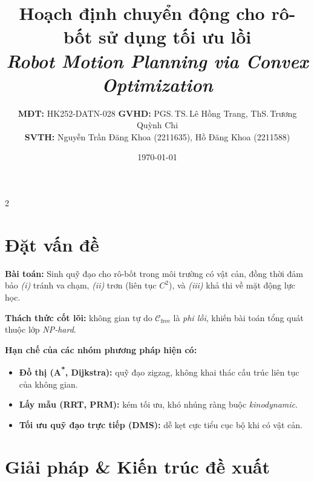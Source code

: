 \documentclass[final]{beamer}
\title
[HK252 -- DATN -- Hoạch định chuyển động cho rô-bốt sử dụng tối ưu lồi]
{
Hoạch định chuyển động cho rô-bốt sử dụng tối ưu lồi \\[0.4ex]
\normalsize \textit{Robot Motion Planning via Convex Optimization}
}
\author{
\textbf{MĐT:} HK252-DATN-028 \quad\textbar\quad
\textbf{GVHD:} PGS.\,TS.\,Lê Hồng Trang, ThS.\,Trương Quỳnh Chi \\
\textbf{SVTH:} Nguyễn Trần Đăng Khoa (2211635), Hồ Đăng Khoa (2211588)
}
\institute
[HCMUT]
{
Khoa Khoa học và Kỹ thuật Máy tính — Trường ĐH Bách Khoa, ĐHQG-HCM
}
\date{\today}
\begin{document}
\begin{frame}[t]
\begin{multicols}{2}
\justifying

\section{Đặt vấn đề}

\textbf{Bài toán:} Sinh quỹ đạo cho rô-bốt trong môi trường có vật cản,
đồng thời đảm bảo \emph{(i)} tránh va chạm, \emph{(ii)} trơn (liên tục $C^2$),
và \emph{(iii)} khả thi về mặt động lực học.

\medskip

\textbf{Thách thức cốt lõi:} không gian tự do $\mathcal{C}_{\mathrm{free}}$
là \emph{phi lồi}, khiến bài toán tổng quát thuộc lớp \emph{NP-hard}.

\medskip

\textbf{Hạn chế của các nhóm phương pháp hiện có:}
\begin{itemize}
    \item \textbf{Đồ thị (A\textsuperscript{*}, Dijkstra):} quỹ đạo zigzag,
    không khai thác cấu trúc liên tục của không gian.
    \item \textbf{Lấy mẫu (RRT, PRM):} kém tối ưu, khó nhúng ràng buộc
    \emph{kinodynamic}.
    \item \textbf{Tối ưu quỹ đạo trực tiếp (DMS):} dễ kẹt cực tiểu cục bộ
    khi có vật cản.
\end{itemize}

\medskip



\section{Giải pháp \& Kiến trúc đề xuất}



\end{multicols}
\end{frame}
\end{document}
